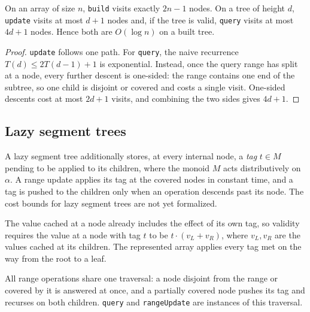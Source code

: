 \begin{theorem}
  \label{thm:segment-tree-cost}
  \leanok
  On an array of size $n$, \texttt{build} visits exactly $2n - 1$ nodes. On a tree of
  height $d$, \texttt{update} visits at most $d + 1$ nodes and, if the tree is valid,
  \texttt{query} visits at most $4d + 1$ nodes. Hence both are $O(\log n)$ on a built tree.
\end{theorem}
\begin{proof}
  \leanok
  \texttt{update} follows one path. For \texttt{query}, the naive recurrence
  $T(d) \le 2T(d - 1) + 1$ is exponential. Instead, once the query range has split at a
  node, every further descent is one-sided: the range contains one end of the subtree, so
  one child is disjoint or covered and costs a single visit. One-sided descents cost at most
  $2d + 1$ visits, and combining the two sides gives $4d + 1$.
\end{proof}

\subsection{Lazy segment trees}

A lazy segment tree additionally stores, at every internal node, a \emph{tag} $t \in M$
pending to be applied to its children, where the monoid $M$ acts distributively on
$\alpha$. A range update applies its tag at the covered nodes in constant time, and a tag
is pushed to the children only when an operation descends past its node. The cost bounds
for lazy segment trees are not yet formalized.

\begin{definition}
  \label{def:lazy-segment-tree}
  \leanok
  The value cached at a node already includes the effect of its own tag, so validity
  requires the value at a node with tag $t$ to be $t \cdot (v_L + v_R)$, where $v_L, v_R$
  are the values cached at its children. The represented array applies every tag met on
  the way from the root to a leaf.
\end{definition}

\begin{definition}
  \label{def:lazy-range-traversal}
  \leanok
  All range operations share one traversal: a node disjoint from the range or covered by it
  is answered at once, and a partially covered node pushes its tag and recurses on both
  children. \texttt{query} and \texttt{rangeUpdate} are instances of this traversal.
\end{definition}

